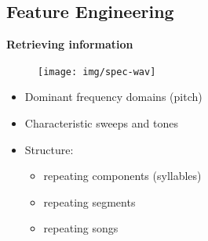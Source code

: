 \documentclass[t, xcolor={dvipsnames}]{beamer}
\begin{document}
\subsection{Feature Engineering}
\begin{frame}[fragile]
  \vspace{0.5cm}
  {\bfseries\Large Retrieving information}\\
  \begin{figure}
    \texttt{[image: img/spec-wav]}
  \end{figure}
  \vspace{-0.3cm}
  \begin{addmargin}{0.5cm}
    \begin{itemize}
      \item Dominant frequency domains (pitch)
      \item Characteristic sweeps and tones
      \item Structure:
      \begin{itemize}
        \item repeating components (syllables)
        \item repeating segments
        \item repeating songs
      \end{itemize}
    \end{itemize}
  \end{addmargin}
\end{frame}

\end{document}
